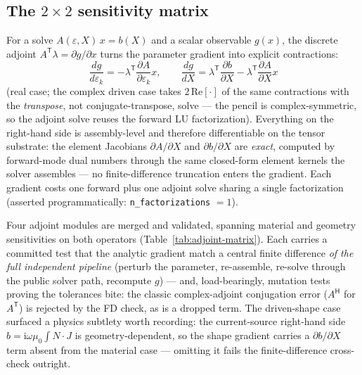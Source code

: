 \documentclass{anvil-paper}
\begin{document}
\subsection{The \texorpdfstring{$2\times 2$}{2x2} sensitivity matrix}
\label{sec:adjoint-matrix}

For a solve $A(\varepsilon, X)\,x = b(X)$ and a scalar observable
$g(x)$, the discrete adjoint $A^{\mathsf{T}}\lambda = \partial g/\partial
x$ turns the parameter gradient into explicit contractions:
\begin{equation}
  \frac{dg}{d\varepsilon_k}
    = -\lambda^{\mathsf{T}}\frac{\partial A}{\partial \varepsilon_k}x,
  \qquad
  \frac{dg}{dX}
    = \lambda^{\mathsf{T}}\frac{\partial b}{\partial X}
      - \lambda^{\mathsf{T}}\frac{\partial A}{\partial X}x
  \label{eq:adjoint}
\end{equation}
(real case; the complex driven case takes $2\,\mathrm{Re}[\cdot]$ of the
same contractions with the \emph{transpose}, not conjugate-transpose,
solve --- the pencil is complex-symmetric, so the adjoint solve reuses
the forward LU factorization). Everything on the right-hand side is
assembly-level and therefore differentiable on the tensor substrate: the
element Jacobians $\partial A/\partial X$ and $\partial b/\partial X$ are
\emph{exact}, computed by forward-mode dual numbers through the same
closed-form element kernels the solver assembles --- no finite-difference
truncation enters the gradient. Each gradient costs one forward plus one
adjoint solve sharing a single factorization (asserted programmatically:
\texttt{n\_factorizations} $= 1$).

Four adjoint modules are merged and validated, spanning material and
geometry sensitivities on both operators
(Table~\ref{tab:adjoint-matrix}). Each carries a committed test that the
analytic gradient match a central finite difference \emph{of the full
independent pipeline} (perturb the parameter, re-assemble, re-solve
through the public solver path, recompute $g$) --- and, load-bearingly,
mutation tests proving the tolerances bite: the classic complex-adjoint
conjugation error ($A^{\mathsf{H}}$ for $A^{\mathsf{T}}$) is rejected by
the FD check, as is a dropped term. The driven-shape case surfaced a
physics subtlety worth recording: the current-source right-hand side
$b = \mathrm{i}\omega\mu_0\!\int\! N\cdot J$ is geometry-dependent, so
the shape gradient carries a $\partial b/\partial X$ term absent from the
material case --- omitting it fails the finite-difference cross-check
outright.
\end{document}
